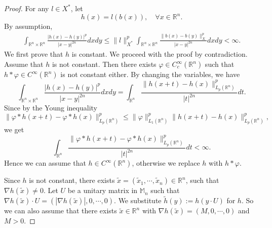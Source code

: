 \documentclass[oneside,english,a4wide]{amsart}
\numberwithin{equation}{section}
\numberwithin{figure}{section}
\theoremstyle{plain}
\theoremstyle{plain}
\theoremstyle{definition}
\theoremstyle{plain}
\theoremstyle{remark}
\theoremstyle{definition}
\theoremstyle{remark}
\theoremstyle{definition}
\newcommand{\8}{\infty}
\begin{document}
\begin{proof}
	For any $l\in X^*$, let $$h(x)=l( b(x)),\quad \forall x\in \mathbb{R}^n.$$ 
	By assumption,
	\begin{equation*}
		\begin{aligned}
			\int_{\mathbb{R}^n\times\mathbb{R}^n}\frac{|h(x)-h(y)|^p}{|x-y|^{2n}}dxdy\le \|l\|^p_{X^*}\int_{\mathbb{R}^n\times\mathbb{R}^n}\frac{\|b(x)-b(y)\|_{X}^p}{|x-y|^{2n}}dxdy<\infty.
		\end{aligned}
	\end{equation*}
	We first prove that $h$ is constant. We proceed with the proof by contradiction. Assume that $h$ is not constant. Then there exists $\varphi\in C_c^\infty(\mathbb{R}^n)$ such that $h\ast\varphi\in C^\infty(\mathbb{R}^n)$ is not constant either.
	By changing the variables, we have
	\[\int_{\mathbb{R}^n\times\mathbb{R}^n}\frac{|h(x)-h(y)|^p}{|x-y|^{2n}}dxdy=\int_{\mathbb{R}^n}\frac{\|h(x+t)-h(x)\|^p_{L_p(\mathbb{R}^n)}}{|t|^{2n}}dt.\]
	 Since by the Young inequality
	\[\|\varphi\ast h(x+t)-\varphi\ast h(x)\|^p_{L_p(\mathbb{R}^n)}\le \|\varphi\|^p_{L_1(\mathbb{R}^n)}\|h(x+t)-h(x)\|^p_{L_p(\mathbb{R}^n)},\]
	we get
	\[\int_{\mathbb{R}^n}\frac{\|\varphi\ast h(x+t)-\varphi\ast h(x)\|^p_{L_p(\mathbb{R}^n)}}{|t|^{2n}}dt<\infty.\]
	Hence we can assume that $h\in C^\infty(\mathbb{R}^n)$, otherwise we replace $h$ with $h\ast\varphi$.
	
	Since $h$ is not constant, there exists $\tilde{x}=(\tilde{x}_1,\cdots,\tilde{x}_n)\in\mathbb{R}^n$, such that $\nabla h(\tilde{x})\neq 0$. Let $U$ be a unitary matrix in $\mathbb{M}_n$ such that $\nabla h(\tilde{x})\cdot U=(|\nabla h(\tilde{x})|, 0, \cdots, 0)$. We substitute $\tilde{h}(y):=h(y\cdot U)$ for $h$.
	So we can also assume that there exists $\tilde{x}\in\mathbb{R}^n$ with $\nabla h(\tilde{x})=(M, 0, \cdots, 0)$ and $M>0$.
	

\end{proof}
\end{document}
